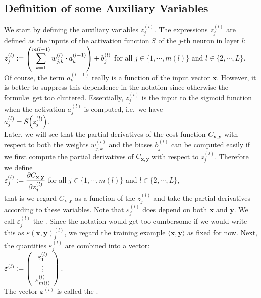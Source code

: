 \subsection{Definition of some Auxiliary Variables}
We start by defining the auxiliary variables $z_j^{(l)}$.
 The expressions $z_j^{(l)}$  are defined as the inputs of the activation function $S$ of the $j$-th neuron in
 layer $l$:
\\[0.2cm]
\hspace*{1.3cm}
$\displaystyle z_j^{(l)} := \left(\sum\limits_{k=1}^{m(l-1)}  w_{j,k}^{(l)} \cdot a_k^{(l-1)}\right) + b_j^{(l)}$
\quad for all  $j \in \{1, \cdots, m(l)\}$ and $l \in \{2,\cdots,L\}$.
\\[0.2cm]
Of course, the term  $a_k^{(l-1)}$ really is a function of the input vector $\mathbf{x}$.  However, it is better to suppress
this dependence in the notation since otherwise the formul\ae\ get too cluttered.
Essentially, $z_j^{(l)}$ is the input to the sigmoid function when the activation $a_j^{(l)}$ is computed,
i.e.~we have
\\[0.2cm]
\hspace*{1.3cm}
$a_j^{(l)} = S\Bigl(z_j^{(l)}\Bigr)$.
\\[0.2cm]
Later, we will see that the partial derivatives of the cost function $C_{\mathbf{x}, \mathbf{y}}$ with respect to both the weights
$w_{j,k}^{(l)}$ and the biases $b_j^{(l)}$ can be computed easily if we first compute the partial derivatives
of $C_{\mathbf{x}, \mathbf{y}}$ with respect to $z_j^{(l)}$.  Therefore we define
\\[0.2cm]
\hspace*{1.3cm}
$\displaystyle\varepsilon_j^{(l)} := \frac{\partial C_{\mathbf{x}, \mathbf{y}}}{\partial z_j^{(l)}}$ \quad for all $j \in \{1, \cdots, m(l)\}$ and $l \in \{2,\cdots, L\}$,
\\[0.2cm]
that is we regard $C_{\mathbf{x}, \mathbf{y}}$ as a function of the $z_j^{(l)}$ and take the partial
derivatives according to these variables.  
Note that $\varepsilon_j^{(l)}$ does depend on both $\mathbf{x}$ and $\mathbf{y}$.  
We call  $\varepsilon_j^{(l)}$ the . 
Since the notation would
get too cumbersome if we would write this as $\varepsilon(\mathbf{x}, \mathbf{y})_j^{(l)}$, we regard the training
example $\langle\mathbf{x}, \mathbf{y}\rangle$ as fixed for now.  Next, the quantities $\varepsilon_j^{(l)}$ are combined into a vector:
\\[0.2cm]
\hspace*{1.3cm}
$\boldsymbol{\varepsilon}^{(l)} := \left(
  \begin{array}[c]{c}
    \varepsilon_1^{(l)}      \\
    \vdots             \\
    \varepsilon_{m(l)}^{(l)}  
  \end{array}
  \right)
$.
\\[0.2cm]
The vector $\boldsymbol{\varepsilon}^{(l)}$ is called the .

